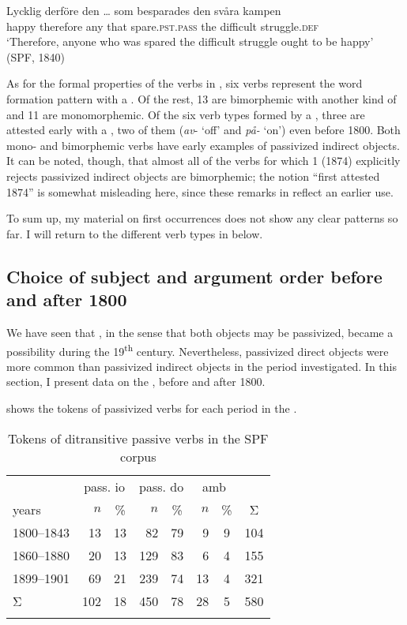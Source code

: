 \documentclass[output=paper]{langscibook}
\begin{document}
\ea%
    \label{ex:falk:19}
\gll Lycklig  derföre    den  …  som  besparades      den  svåra    kampen\\
    happy  therefore  any  {}    that  spare.\textsc{pst}.\textsc{pass}  the  difficult  struggle.\textsc{def}\\
\glt ‘Therefore, anyone who was spared the difficult struggle ought to be happy’ (SPF, 1840)
\z

As for the formal properties of the verbs in , six verbs represent the word formation pattern with a . Of the rest, 13 are bimorphemic with another kind of  and 11 are monomorphemic. Of the six verb types formed by a , three are attested early with a , two of them (\textit{av}{}- ‘off’ and \textit{på-} ‘on’) even before 1800. Both mono- and bimorphemic verbs have early examples of passivized indirect objects. It can be noted, though, that almost all of the verbs for which  1 (1874) explicitly rejects passivized indirect objects are bimorphemic; the notion “first attested 1874” is somewhat misleading here, since these remarks in  reflect an earlier use.


To sum up, my material on first occurrences does not show any clear patterns so far. I will return to the different verb types in  below.


\subsection{Choice of subject and argument order before and after 1800}\label{sec:falk:3.8}


We have seen that , in the sense that both objects may be passivized, became a possibility during the 19\textsuperscript{th} century. Nevertheless, passivized direct objects were more common than passivized indirect objects in the period investigated. In this section, I present data on the , before and after 1800.

 shows the tokens of passivized  verbs for each period in the .

\begin{table}
\caption{Tokens of ditransitive passive verbs in the SPF corpus\label{tab:falk:3}}
\begin{tabular}{lrcrcrcc}
\lsptoprule
          & \multicolumn{2}{c}{pass. io} & \multicolumn{2}{c}{pass. do} & \multicolumn{2}{c}{amb} & \\\cmidrule(lr){2-3}\cmidrule(lr){4-5}\cmidrule(lr){6-7}
years     & $n$ & \%     & $n$ & \%   & $n$ & \% & Σ\\\midrule
1800–1843 & 13  &  13  & 82  & 79 & 9  & 9 & 104\\
1860–1880 & 20  &  13  & 129 & 83 & 6  & 4 & 155\\
1899–1901 & 69  &  21  & 239 & 74 & 13 & 4 & 321\\
Σ         & 102 &  18  & 450 & 78 & 28 & 5 & 580\\
\lspbottomrule
\end{tabular}
\end{table}
\end{document}
